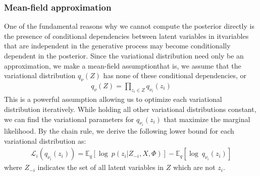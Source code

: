 \documentclass[12pt,letterpaper]{article}
\begin{document}
\subsubsection{Mean-field approximation} 
One of the fundamental reasons why we cannot compute the posterior directly is the presence of conditional dependencies between latent variables in it\textemdash variables that are independent in the generative process may become conditionally dependent in the posterior. Since the variational distribution need only be an approximation, we make a mean-field assumption\textemdash that is, we assume that the variational distribution $q_{\nu}(Z)$ has none of these conditional dependencies, or 
\begin{align} \nonumber q_{\nu}(Z) = \prod\limits_{z_i 
\in Z} q_{\nu_i}(z_i) \end{align}
This is a powerful assumption allowing us to optimize each variational distribution iteratively. While holding all other variational distributions constant, we can find the variational parameters for $q_{\nu_i}(z_i)$ that maximize the marginal likelihood. By the chain rule, we derive the following lower bound for each variational distribution as:
\begin{align}
\mathcal{L}_i(q_{\nu_i}(z_i)) = \mathbb{E}_q[\log\ p(z_i| Z_{-i}, X, \Phi)] - \mathbb{E}_q[\log\ q_{\nu_i}(z_i)]
\end{align} 
where $Z_{-i}$ indicates the set of all latent variables in $Z$ which are not $z_i$. 
\end{document}
